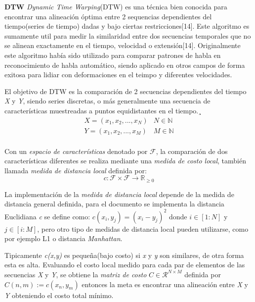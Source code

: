 \hfill\break
\justifying
\textbf{DTW}
	\hfill\break
	\justifying
	\textit{Dynamic Time Warping}(DTW) es una técnica bien conocida para encontrar una alineación óptima entre 2 sequencias dependientes del tiempo(series de tiempo) dadas y bajo ciertas restricciones[14]. Este algoritmo es sumamente util para medir la similaridad entre dos secuencias temporales que no se alinean exactamente en el tiempo, velocidad o extensión[14]. Originalmente este algoritmo había sido utilizado para comparar patrones de habla en reconocimiento de habla automático, siendo aplicado en otros campos de forma exitosa para lidiar con deformaciones en el teimpo y diferentes velocidades.
	
	\hfill\break
	\justifying
	El objetivo de DTW es la comparación de 2 secuencias dependientes del tiempo \textit{X} y \textit{Y}, siendo series discretas, o más generalmente una secuencia de características muestreadas a puntos equidistantes en el tiempo.¸
	\begin{equation*}
		\begin{array}{cc}
			X = (x_1,x_2,...,x_N) & N \in \mathbb{N} \\
			Y = (x_1,x_2,...,x_M) & M \in \mathbb{N} \\
		\end{array}
	\end{equation*}
	
	\hfill\break
	\justifying
	Con un \textit{espacio de características} denotado por $\mathcal{F}$, la comparación de dos características diferentes se realiza mediante una \textit{medida de costo local}, también llamada \textit{medida de distancia local} definida por:
	\begin{equation*}
		c: \mathcal{F} \times \mathcal{F} \rightarrow \mathbb{R}_{\geq 0}
	\end{equation*}
	
	\hfill\break
	\justifying
	La implementación de la \textit{medida de distancia local} depende de la medida de distancia general definida, para el documento se implementa la distancia Euclidiana \textit{c} se define como: $c(x_i, y_j) = (x_i - y_j)^2$ donde $i \in [1:N]$ y $j \in [i:M]$, pero otro tipo de medidas de distancia local pueden utilizarse, como por ejemplo L1 o distancia \textit{Manhattan}.
	
	\hfill\break
	\justifying
	Tipicamente \textit{c(x,y)} es pequeña(bajo costo) si \textit{x} y \textit{y} son similares, de otra forma esta es alta. Evaluando el costo local medido para cada par de elementos de las secuencias \textit{X} y \textit{Y}, se obtiene la \textit{matriz de costo} $C \in \mathcal{R}^{N\times M}$ definida por $C(n,m):=c(x_n,y_m)$ entonces la meta es encontrar una alineación entre \textit{X} y \textit{Y} obteniendo el costo total mínimo.
	
